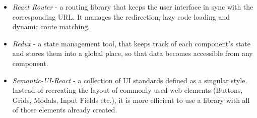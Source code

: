 \begin{itemize}
	\item \textit{React Router} - a routing library that keeps the user interface in sync with the corresponding URL. It manages the redirection, lazy code loading and dynamic route matching.
	\item \textit{Redux} - a state management tool, that keeps track of each component's state and stores them into a global place, so that data becomes accessible from any component.
	\item \textit{Semantic-UI-React} - a collection of UI standards defined as a singular style. Instead of recreating the layout of commonly used web elements (Buttons, Grids, Modals, Input Fields etc.), it is more efficient to use a library with all of those elements already created.
\end{itemize}


